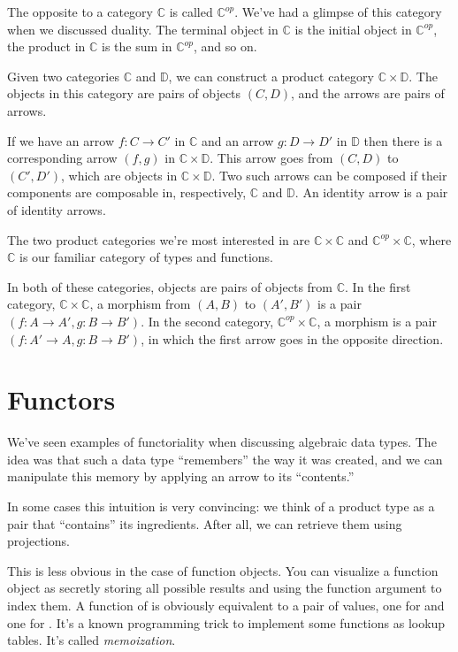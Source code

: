 \documentclass[DaoFP]{subfiles}
\begin{document}
The opposite to a category $\mathbb{C}$ is called $\mathbb{C}^{op}$. We've had a glimpse of this category when we discussed duality. The terminal object in  $\mathbb{C}$ is the initial object in $\mathbb{C}^{op}$, the product in  $\mathbb{C}$ is the sum in $\mathbb{C}^{op}$, and so on. 

Given two categories $\mathbb{C}$ and $\mathbb{D}$, we can construct a product category $\mathbb{C} \times \mathbb{D}$. The objects in this category are pairs of objects $(C, D)$, and the arrows are pairs of arrows. 

If we have an arrow $f \colon C \to C'$ in $\mathbb{C}$ and an arrow $g \colon D \to D'$ in $\mathbb{D}$ then there is a corresponding arrow $(f, g)$ in $\mathbb{C} \times \mathbb{D}$.  This arrow goes from $(C, D)$ to $(C', D')$, which are objects in $\mathbb{C} \times \mathbb{D}$. Two such arrows can be composed if their components are composable in, respectively, $\mathbb{C}$ and $\mathbb{D}$. An identity arrow is a pair of identity arrows.

The two product categories we're most interested in are $\mathbb{C} \times \mathbb{C}$ and $\mathbb{C}^{op} \times \mathbb{C}$, where $\mathbb{C}$ is our familiar category of types and functions.

In both of these categories, objects are pairs of objects from $\mathbb{C}$. In the first category, $\mathbb{C} \times \mathbb{C}$, a morphism from $(A, B)$ to $(A', B')$ is a pair $(f \colon A \to A', g \colon B \to B')$. In the second category, $\mathbb{C}^{op} \times \mathbb{C}$, a morphism is a pair $(f \colon A' \to A, g \colon B \to B')$, in which the first arrow goes in the opposite direction.

\section{Functors}

We've seen examples of functoriality when discussing algebraic data types. The idea was that such a data type 	``remembers'' the way it was created, and we can manipulate this memory by applying an arrow to its ``contents.'' 

In some cases this intuition is very convincing: we think of a product type as a pair that ``contains'' its ingredients. After all, we can retrieve them using projections. 

This is less obvious in the case of function objects. You can visualize a function object as secretly storing all possible results and using the function argument to index them. A function of  is obviously equivalent to a pair of values, one for  and one for . It's a known programming trick to implement some functions as lookup tables. It's called \emph{memoization}. 
\end{document}
